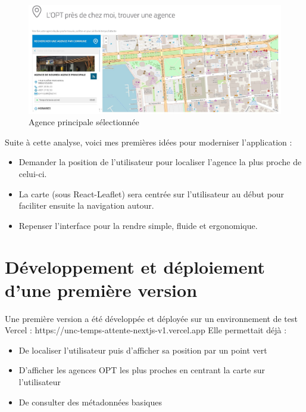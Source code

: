 \documentclass[12pt,a4paper]{report}
\begin{document}
\begin{figure}[h] %
    \centering
    \includegraphics[width=1\textwidth]{ressources_rapport/ancien_app_opt_noumea_agence_principale.JPG}
    \caption{Agence principale sélectionnée}
    \label{fig:exemple}
\end{figure}
\vspace{2cm}
Suite à cette analyse, voici mes premières idées pour moderniser l'application :
\begin{itemize}
    \item Demander la position de l'utilisateur pour localiser l'agence la plus proche de celui-ci.
    \item La carte (sous React-Leaflet) sera centrée sur l'utilisateur au début pour faciliter ensuite la navigation autour.
    \item Repenser l'interface pour la rendre simple, fluide et ergonomique.
\end{itemize}

\newpage
\section{Développement et déploiement d'une première version}
Une première version a été développée et déployée sur un environnement de test Vercel : https://unc-temps-attente-nextjs-v1.vercel.app
Elle permettait déjà :
\begin{itemize}
    \item De localiser l’utilisateur puis d'afficher sa position par un point vert
    \item D’afficher les agences OPT les plus proches en centrant la carte sur l'utilisateur
    \item De consulter des métadonnées basiques
\end{itemize}
\end{document}
